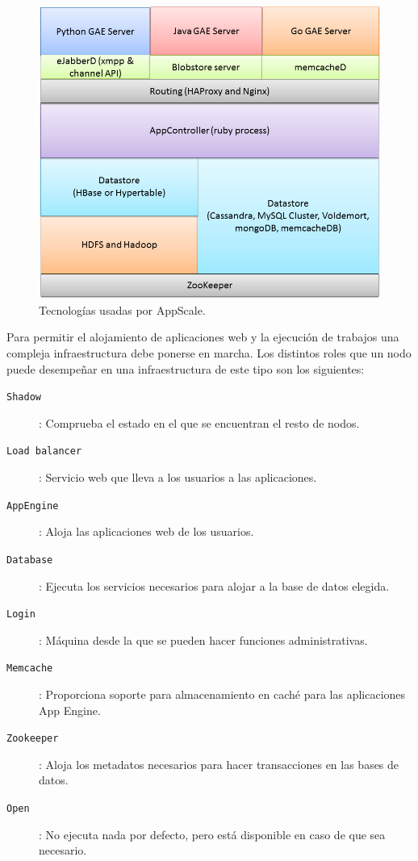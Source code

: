 \begin{figure} [!htbp]
  \centering
  \includegraphics[width=13.5cm]{imagenes/AppScale_Stack.png}
  \caption{Tecnologías usadas por AppScale.}
\label{figure:tecnologias-appscale}
\end{figure}

Para permitir el alojamiento de aplicaciones web y la ejecución de trabajos una compleja infraestructura debe ponerse en marcha. Los distintos roles que un nodo puede desempeñar en una infraestructura de este tipo son los siguientes:

\begin{description}
\item[\texttt{Shadow}]: Comprueba el estado en el que se encuentran el resto de nodos.
\item[\texttt{Load balancer}]: Servicio web que lleva a los usuarios a las aplicaciones.
\item[\texttt{AppEngine}]: Aloja las aplicaciones web de los usuarios.
\item[\texttt{Database}]: Ejecuta los servicios necesarios para alojar a la base de datos elegida.
\item[\texttt{Login}]: Máquina desde la que se pueden hacer funciones administrativas.
\item[\texttt{Memcache}]: Proporciona soporte para almacenamiento en caché para las aplicaciones App Engine.
\item[\texttt{Zookeeper}]: Aloja los metadatos necesarios para hacer transacciones en las bases de datos.
\item[\texttt{Open}]: No ejecuta nada por defecto, pero está disponible en caso de que sea necesario.
\end{description}

